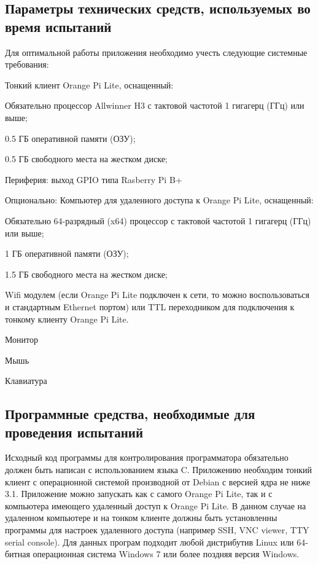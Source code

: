 \subsection{Параметры технических средств, используемых во время испытаний}
Для оптимальной работы приложения необходимо учесть следующие системные требования:
\begin{my_enumerate}
\item Тонкий клиент Orange Pi Lite, оснащенный:
    \begin{my_enumerate}
    \item Обязательно процессор Allwinner H3 с тактовой частотой 1 гигагерц (ГГц) или выше;
    \item 0.5 ГБ оперативной памяти (ОЗУ);
    \item 0.5 ГБ свободного места на жестком диске;
    \item Периферия: выход GPIO типа Rasberry Pi B+
    \end{my_enumerate}
\item Опционально: Компьютер для удаленного доступа к Orange Pi Lite, оснащенный:
    \begin{my_enumerate}
    \item Обязательно 64-разрядный (x64) процессор с тактовой частотой 1 гигагерц (ГГц) или выше;
    \item 1 ГБ оперативной памяти (ОЗУ);
    \item 1.5 ГБ свободного места на жестком диске;
    \item Wifi модулем (если Orange Pi Lite подключен к сети, то можно воспользоваться и стандартным Ethernet портом) или TTL переходником для подключения к тонкому клиенту Orange Pi Lite.
    \end{my_enumerate}
\item Монитор
\item Мышь
\item Клавиатура
\end{my_enumerate}


\subsection{Программные средства, необходимые для проведения испытаний}
Исходный код программы для контролирования программатора обязательно должен быть написан с использованием языка C. Приложению необходим тонкий клиент с операционной системой производной от Debian с версией ядра не ниже 3.1. Приложение можно запускать как с  самого Orange Pi Lite, так и с компьютера имеющего удаленный доступ к Orange Pi Lite. В данном случае на удаленном компьютере и на тонком клиенте должны быть установленны программы для настроек удаленного доступа (например SSH, VNC viewer, TTY serial console). Для данных програм подходит любой дистрибутив Linux или 64-битная операционная система Windows 7 или более поздняя версия Windows.


